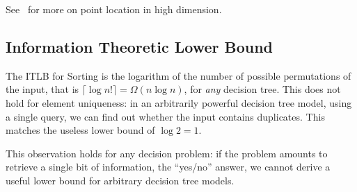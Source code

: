 See~\cite[Section~34.6]{Sn04} for more on point location in high dimension.

\subsection{Information Theoretic Lower Bound}%
\label{sec:history:sum:itlb}

The ITLB for Sorting is the logarithm of the number of possible
permutations of the input, that is \(\lceil \log n! \rceil = \Omega(n \log
n)\), for \emph{any} decision tree. This does not hold for element uniqueness:
in an arbitrarily powerful decision tree model, using a single query, we can
find out whether the input contains duplicates. This matches the useless lower
bound of \(\log 2 = 1\).

This observation holds for any decision problem: if the problem amounts to
retrieve a single bit of information, the ``yes/no'' answer, we cannot
derive a useful lower bound for arbitrary decision tree models.

